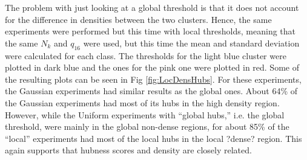 \documentclass[graybox]{svmult}
\begin{document}
The problem with just looking at a global threshold is that it does not account for the difference in densities between the two clusters. Hence, the same experiments were performed but this time with local thresholds, meaning that the same $N_k$ and $q_{16}$ were used, but this time the mean and standard deviation were calculated for each class. The thresholds for the light blue cluster were plotted in dark blue and the ones for the pink one were plotted in red. Some of the resulting plots can be seen in Fig \ref{fig:LocDensHubs}. For these experiments, the Gaussian experiments had similar results as the global ones. About 64\% of the Gaussian experiments had most of its hubs in the high density region. However, while the Uniform experiments with ``global hubs,'' i.e. the global threshold, were mainly in the global non-dense regions, for about 85\% of the ``local'' experiments had most of the local hubs in the local ?dense? region. This again supports that hubness scores and density are closely related. 
\end{document}
